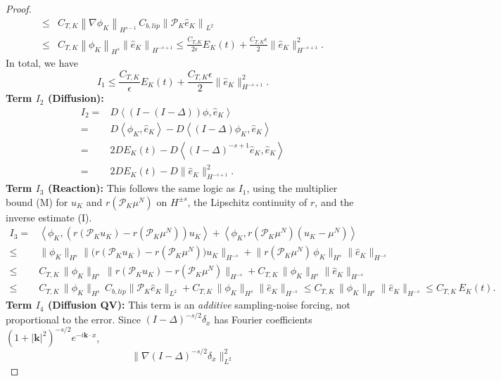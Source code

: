 \documentclass[a4paper,fleqn]{cas-sc}
\theoremstyle{definition}
\theoremstyle{remark}
\begin{document}
\begin{proof}
\[\begin{aligned}
     \leq&  C_{T,K}\left\|\nabla  \phi_K\right\|_{H^{s-1}} \,C_{b,lip}\left\|\mathcal P_K\hat{e}_K\right\|_{L^2} \\
     \leq & C_{T,K}\left\| \phi_K\right\|_{H^{s}} \left\|\hat{e}_K \right\|_{H^{-s+1}}
     \leq \frac{C_{T,K}}{2\epsilon}E_K(t)
        + \frac{C_{T,K}\epsilon}{2}\|\hat{e}_K\|^2_{H^{-s+1}}.
\end{aligned}
\]
In total, we have
\[
I_1\leq \frac{C_{T,K}}{\epsilon}E_K(t)
        + \frac{C_{T,K}\epsilon}{2}\|\hat{e}_K\|^2_{H^{-s+1}}.
\]
\textbf{Term $I_2$ (Diffusion): }
\[
\begin{aligned}
I_{2} = & D\left\langle (I-(I-\Delta))  \phi ,  \hat{e}_K \right\rangle\\
   =& D\left\langle  \phi_K ,  \hat{e}_K \right\rangle -  D\left\langle (I-\Delta)  \phi_K ,  \hat{e}_K \right\rangle\\
   = & 2D E_K(t) - D\left\langle (I-\Delta)^{-s+1}  \hat{e}_K ,  \hat{e}_K \right\rangle\\
   = & 2D E_K(t) - D\|\hat{e}_K\|_{H^{-s+1}}^2.
\end{aligned}
\]
\textbf{Term $I_3$ (Reaction):} This follows the same logic as $I_1$, using the
multiplier bound (M) for $u_K$ and $r(\mathcal P_K\mu^N)$ on $H^{\pm s}$, the Lipschitz
continuity of $r$, and the inverse estimate (I).
\[
\begin{aligned}
I_3 
=& \left\langle   \phi_K , \left(r\left(\mathcal P_K u_K\right)-r\left(\mathcal P_K \mu^N\right)\right)u_K\right\rangle 
+ \left\langle   \phi_K , r(\mathcal P_K \mu^N)\left(u_K-\mu^N\right) \right\rangle \\
\leq & \|\phi_K\|_{H^s}\bigl\|\bigl(r(\mathcal P_K u_K)-r(\mathcal P_K\mu^N)\bigr)u_K\bigr\|_{H^{-s}}
+ \bigl\|r(\mathcal P_K\mu^N)\,\phi_K\bigr\|_{H^s}\|\hat e_K\|_{H^{-s}} \\
\leq & C_{T,K}\,\|\phi_K\|_{H^s}\,\bigl\|r(\mathcal P_K u_K)-r(\mathcal P_K\mu^N)\bigr\|_{H^{-s}}
+ C_{T,K}\,\|\phi_K\|_{H^s}\|\hat e_K\|_{H^{-s}} \\
\leq & C_{T,K}\,\|\phi_K\|_{H^s}\,C_{b,lip}\|\mathcal P_K\hat e_K\|_{L^2}
+ C_{T,K}\,\|\phi_K\|_{H^s}\|\hat e_K\|_{H^{-s}}
\leq  C_{T,K}\,\|\phi_K\|_{H^s}\|\hat e_K\|_{H^{-s}}
\le  C_{T,K}\, E_K(t).
\end{aligned}
\]
\textbf{Term $I_4$ (Diffusion QV):}
This term is an \emph{additive} sampling-noise forcing, not proportional to the
error. Since $(I-\Delta)^{-s/2}\delta_x$ has Fourier coefficients
$(1+|\mathbf k|^2)^{-s/2}e^{-i\mathbf k\cdot x}$,
\[
\bigl\|\nabla(I-\Delta)^{-s/2}\delta_x\bigr\|_{L^2}^2
\]
\end{proof}
\end{document}

